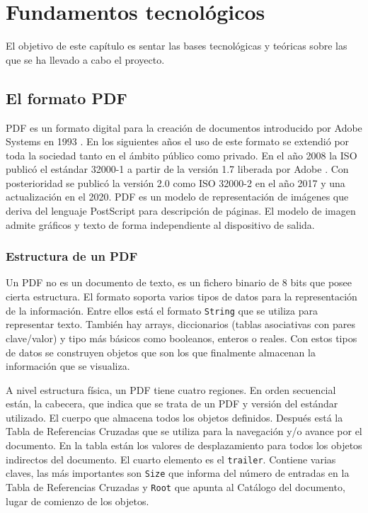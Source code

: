 
\chapter{Fundamentos tecnológicos}
\label{chap:fundamentos-tecnologicos}

El objetivo de este capítulo es sentar las bases tecnológicas y teóricas sobre las que se ha llevado a cabo el proyecto.

\section{El formato PDF}

PDF es un formato digital para la creación de documentos introducido por Adobe Systems en 1993 \cite{adobe_systems_inc_quick_2010}. En los siguientes años el uso de este formato se extendió por toda la sociedad tanto en el ámbito público como privado. En el año 2008 la ISO publicó el estándar 32000-1 a partir de la versión 1.7 liberada por Adobe \cite{adobe_systems_inc_iso_2008}. Con posterioridad se publicó la versión 2.0 como ISO 32000-2 \cite{international_organization_for_standardization_iso_2017} en el año 2017 y una actualización en el 2020. PDF es un modelo de representación de imágenes que deriva del lenguaje PostScript para descripción de páginas. El modelo de imagen admite gráficos y texto de forma independiente al dispositivo de salida.

\subsection{Estructura de un PDF}

Un PDF no es un documento de texto, es un fichero binario de 8 bits que posee cierta estructura. El formato soporta varios tipos de datos para la representación de la información. Entre ellos está el formato \verb|String| que se utiliza para representar texto. También hay arrays, diccionarios (tablas asociativas con pares clave/valor) y tipo más básicos como booleanos, enteros o reales. Con estos tipos de datos se construyen objetos que son los que finalmente almacenan la información que se visualiza.

A nivel estructura física, un PDF tiene cuatro regiones. En orden secuencial están, la cabecera, que indica que se trata de un PDF y versión del estándar utilizado. El cuerpo que almacena todos los objetos definidos. Después está la Tabla de Referencias Cruzadas que se utiliza para la navegación y/o avance por el documento. En la tabla están los valores de desplazamiento para todos los objetos indirectos del documento. El cuarto elemento es el \verb|trailer|. Contiene varias claves, las más importantes son \verb|Size| que informa del número de entradas en la Tabla de Referencias Cruzadas y \verb|Root| que apunta al Catálogo del documento, lugar de comienzo de los objetos.


